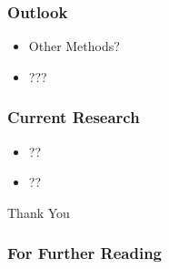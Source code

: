 \documentclass{beamer}
\begin{document}
  \begin{frame}
  \frametitle{Outlook}
  \begin{itemize}
    \item Other Methods?
    \item ???
    \end{itemize}
\end{frame}

\begin{frame}
 \frametitle{Current Research}
\begin{itemize}
 \item ??
\item ??
\end{itemize}
\end{frame}




\begin{frame}
 Thank You
\end{frame}



\begin{frame}[allowframebreaks]
  \frametitle{For Further Reading}
    
    

 
    




\end{frame}
\end{document}
